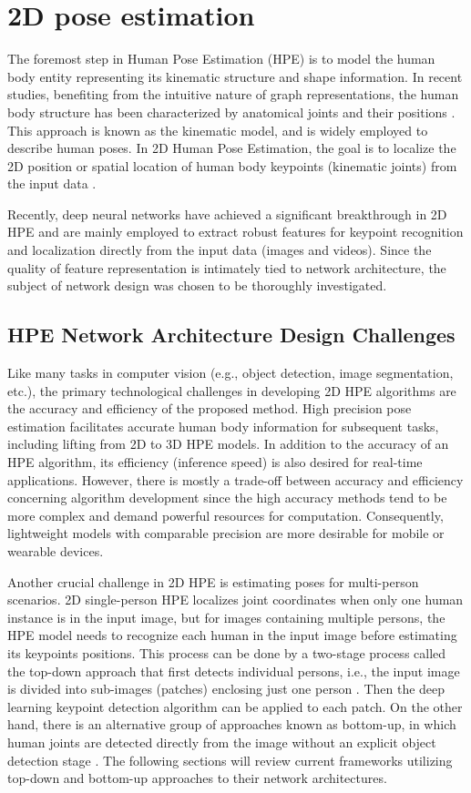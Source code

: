 \section{2D pose estimation}
The foremost step in Human Pose Estimation (HPE) is to model the human body entity representing its kinematic structure and shape information. In recent studies, benefiting from the intuitive nature of graph representations, the human body structure has been characterized by anatomical joints and their positions \cite{zuffi_pictorial_2012}. This approach is known as the kinematic model, and is widely employed to describe human poses. In 2D Human Pose Estimation, the goal is to localize the 2D position or spatial location of human body keypoints (kinematic joints) from the input data \cite{rafi_efficient_2016}.

Recently, deep neural networks have achieved a significant breakthrough in 2D HPE and are mainly employed to extract robust features for keypoint recognition and localization directly from the input data (images and videos). Since the quality of feature representation is intimately tied to network architecture, the subject of network design was chosen to be thoroughly investigated. 

\subsection*{HPE Network Architecture Design Challenges}

Like many tasks in computer vision (e.g., object detection, image segmentation, etc.), the primary technological challenges in developing 2D HPE algorithms are the accuracy and efficiency of the proposed method. High precision pose estimation facilitates accurate human body information for subsequent tasks, including lifting from 2D to 3D HPE models. In addition to the accuracy of an HPE algorithm, its efficiency (inference speed) is also desired for real-time applications. However, there is mostly a trade-off between accuracy and efficiency concerning algorithm development since the high accuracy methods tend to be more complex and demand powerful resources for computation. Consequently, lightweight models with comparable precision are more desirable for mobile or wearable devices. 

Another crucial challenge in 2D HPE is estimating poses for multi-person scenarios. 2D single-person HPE localizes joint coordinates when only one human instance is in the input image, but for images containing multiple persons, the HPE model needs to recognize each human in the input image before estimating its keypoints positions. This process can be done by a two-stage process called the top-down approach that first detects individual persons, i.e., the input image is divided into sub-images (patches) enclosing just one person \cite{sun_deep_2019}. Then the deep learning keypoint detection algorithm can be applied to each patch. On the other hand, there is an alternative group of approaches known as bottom-up, in which human joints are detected directly from the image without an explicit object detection stage \cite{cheng_higherhrnet_2020}. The following sections will review current frameworks utilizing top-down and bottom-up approaches to their network architectures.

